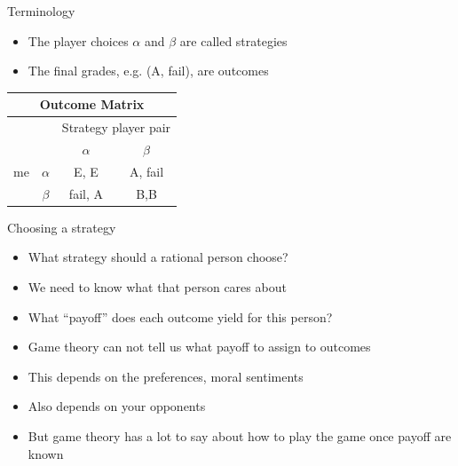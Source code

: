 \documentclass{beamer}
\begin{document}
\begin{frame}{Terminology}
  \begin{itemize}
    \item The player choices $\alpha$ and $\beta$ are called strategies
    \item The final grades, e.g. (A, fail), are outcomes
  \end{itemize}
\begin{center}
  \begin{tabular}{|c|c|c|c|}
    \hline
    \multicolumn{4}{|c|}{Outcome Matrix}\\
    \hline
 &
&
\multicolumn{2}{|c|}{Strategy player pair}\\
    \hline
 & 
     & $\alpha$ & $\beta$  \\
    \hline
me & $\alpha$
     & E, E & A, fail \\
    \hline
 & $\beta$
     & fail, A & B,B \\
    \hline
  \end{tabular}
\end{center}
\end{frame}

\begin{frame}{Choosing a strategy}
  \begin{itemize}
  \item What strategy should a rational person choose?
  \item<2-> We need to know what that person cares about
  \item<3-> What ``payoff'' does each outcome yield for
    this person?
  \item<4-> Game theory can not tell us what payoff to assign to outcomes
  \item<4-> This depends on the preferences, moral sentiments
  \item<4-> Also depends on your opponents
  \item<5-> But game theory has a lot to say about how to play the game once payoff are known
  \end{itemize}
\end{frame}
\end{document}
